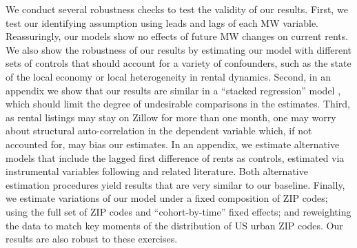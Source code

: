 We conduct several robustness checks to test the validity of our results.
First, we test our identifying assumption using leads and lags of each MW variable.
Reassuringly, our models show no effects of future MW changes on current rents.
We also show the robustness of our results by estimating our model with different 
sets of controls that should account for a variety of confounders, such as the state
of the local economy or local heterogeneity in rental dynamics.
Second, in an appendix we show that our results are similar in a ``stacked regression'' 
model \parencite[similar to][]{CegnizEtAl2019}, which should limit the degree of 
undesirable comparisons in the estimates.
Third, as rental listings may stay on Zillow for more than one month, one may worry 
about structural auto-correlation in the dependent variable which, if not accounted for, 
may bias our estimates.
In an appendix, we estimate alternative models that include the lagged first difference 
of rents as controls, estimated via instrumental variables following 
\textcite{ArellanoBond1991} and related literature.
Both alternative estimation procedures yield results that are very similar to our 
baseline.
Finally, we estimate variations of our model under a fixed composition of ZIP codes;
using the full set of ZIP codes and ``cohort-by-time'' fixed effects; and reweighting
the data to match key moments of the distribution of US urban ZIP codes.
Our results are also robust to these exercises.


